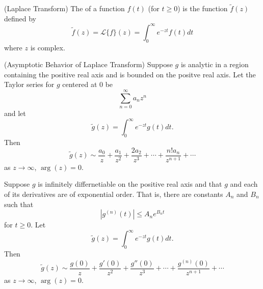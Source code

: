 \begin{defn}{(Laplace Transform)}
The  of a function $f(t)$ (for $t\geq
0$) is the function $\widetilde{f}(z)$ defined by
\begin{equation}%
\widetilde{f}(z) = \mathcal{L}\{f\}(z) = \int^{\infty}_{0}e^{-zt}f(t)dt
\end{equation}
where $z$ is complex.
\end{defn}
\begin{prop}{(Asymptotic Behavior of Laplace Transform) }%
Suppose $g$ is analytic in a region containing the positive real
axis and is bounded on the positve real axis. Let the Taylor
series for $g$ centered at 0 be
\begin{equation}%
\sum^{\infty}_{n=0} a_{n}z^{n}
\end{equation}
and let
\begin{equation}%
\widetilde{g}(z) = \int^{\infty}_{0}e^{-zt}g(t)dt.
\end{equation}
Then
\begin{equation}%
\widetilde{g}(z)\sim \frac{a_0}{z}+\frac{a_1}{z^2}+\frac{2a_2}{z^3}+\cdots+\frac{n!a_n}{z^{n+1}}+\cdots
\end{equation}
as $z\to\infty$, $\operatorname{arg}(z)=0$.
\end{prop}
\begin{prop}%
Suppose $g$ is infinitely differnetiable on the positive real
axis and that $g$ and each of its derivatives are of exponential
order. That is, there are constants $A_n$ and $B_n$ such that
\begin{equation}%
|g^{(n)}(t)|\leq A_{n}e^{B_{n}t}
\end{equation}
for $t\geq0$. Let
\begin{equation}%
\widetilde{g}(z) = \int^{\infty}_{0}e^{-zt}g(t)dt.
\end{equation}
Then
\begin{equation}%
\widetilde{g}(z)\sim  \frac{g(0)}{z}+\frac{g'(0)}{z^2}+\frac{g''(0)}{z^3}+\cdots+\frac{g^{(n)}(0)}{z^{n+1}}+\cdots
\end{equation}
as $z\to\infty$, $\operatorname{arg}(z)=0$.
\end{prop}
